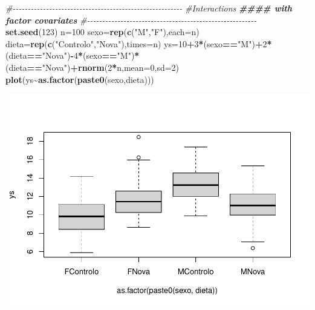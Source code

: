 \documentclass[
]{book}
\newenvironment{Shaded}{\begin{snugshade}}{\end{snugshade}}
\newcommand{\AttributeTok}[1]{\textcolor[rgb]{0.13,0.29,0.53}{#1}}
\newcommand{\CommentTok}[1]{\textcolor[rgb]{0.56,0.35,0.01}{\textit{#1}}}
\newcommand{\DecValTok}[1]{\textcolor[rgb]{0.00,0.00,0.81}{#1}}
\newcommand{\DocumentationTok}[1]{\textcolor[rgb]{0.56,0.35,0.01}{\textbf{\textit{#1}}}}
\newcommand{\FunctionTok}[1]{\textcolor[rgb]{0.13,0.29,0.53}{\textbf{#1}}}
\newcommand{\NormalTok}[1]{#1}
\newcommand{\OtherTok}[1]{\textcolor[rgb]{0.56,0.35,0.01}{#1}}
\newcommand{\SpecialCharTok}[1]{\textcolor[rgb]{0.81,0.36,0.00}{\textbf{#1}}}
\newcommand{\StringTok}[1]{\textcolor[rgb]{0.31,0.60,0.02}{#1}}
\begin{document}
\begin{Shaded}
\begin{Highlighting}[]
\CommentTok{\#{-}{-}{-}{-}{-}{-}{-}{-}{-}{-}{-}{-}{-}{-}{-}{-}{-}{-}{-}{-}{-}{-}{-}{-}{-}{-}{-}{-}{-}{-}{-}{-}{-}{-}{-}{-}{-}{-}{-}{-}{-}{-}{-}{-}{-}{-}{-}{-}{-}{-}{-}{-}{-}{-}{-}{-}}
\CommentTok{\#Interactions}
\DocumentationTok{\#\#\#\# with factor covariates}
\CommentTok{\#{-}{-}{-}{-}{-}{-}{-}{-}{-}{-}{-}{-}{-}{-}{-}{-}{-}{-}{-}{-}{-}{-}{-}{-}{-}{-}{-}{-}{-}{-}{-}{-}{-}{-}{-}{-}{-}{-}{-}{-}{-}{-}{-}{-}{-}{-}{-}{-}{-}{-}{-}{-}{-}{-}{-}{-}}
\FunctionTok{set.seed}\NormalTok{(}\DecValTok{123}\NormalTok{)}
\NormalTok{n}\OtherTok{=}\DecValTok{100}
\NormalTok{sexo}\OtherTok{=}\FunctionTok{rep}\NormalTok{(}\FunctionTok{c}\NormalTok{(}\StringTok{"M"}\NormalTok{,}\StringTok{"F"}\NormalTok{),}\AttributeTok{each=}\NormalTok{n)}
\NormalTok{dieta}\OtherTok{=}\FunctionTok{rep}\NormalTok{(}\FunctionTok{c}\NormalTok{(}\StringTok{"Controlo"}\NormalTok{,}\StringTok{"Nova"}\NormalTok{),}\AttributeTok{times=}\NormalTok{n)}
\NormalTok{ys}\OtherTok{=}\DecValTok{10}\SpecialCharTok{+}\DecValTok{3}\SpecialCharTok{*}\NormalTok{(sexo}\SpecialCharTok{==}\StringTok{"M"}\NormalTok{)}\SpecialCharTok{+}\DecValTok{2}\SpecialCharTok{*}\NormalTok{(dieta}\SpecialCharTok{==}\StringTok{"Nova"}\NormalTok{)}\SpecialCharTok{{-}}\DecValTok{4}\SpecialCharTok{*}\NormalTok{(sexo}\SpecialCharTok{==}\StringTok{"M"}\NormalTok{)}\SpecialCharTok{*}\NormalTok{(dieta}\SpecialCharTok{==}\StringTok{"Nova"}\NormalTok{)}\SpecialCharTok{+}\FunctionTok{rnorm}\NormalTok{(}\DecValTok{2}\SpecialCharTok{*}\NormalTok{n,}\AttributeTok{mean=}\DecValTok{0}\NormalTok{,}\AttributeTok{sd=}\DecValTok{2}\NormalTok{)}
\FunctionTok{plot}\NormalTok{(ys}\SpecialCharTok{\textasciitilde{}}\FunctionTok{as.factor}\NormalTok{(}\FunctionTok{paste0}\NormalTok{(sexo,dieta)))}
\end{Highlighting}
\end{Shaded}

\includegraphics{ECOMODbook_files/figure-latex/a11.1-1.pdf}
\end{document}
